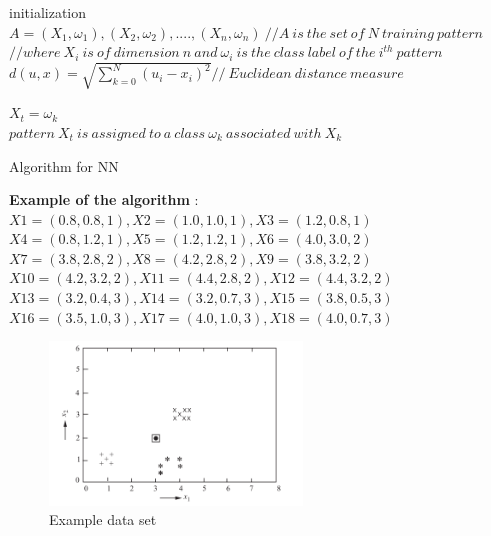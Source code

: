 \begin{algorithm}[H]
\SetAlgoLined

 initialization\;
 $ A=(X_{1},\omega_{1}),(X_{2},\omega_{2}),....,(X_{n},\omega_{n}) \ // A\ is\ the\ set\ of\ N\ training\ pattern $\\
 
 
$ //where\  X_{i}\ is\ of\ dimension\ n\ and\  \omega_{i}\ is\ the\ class\ label\ of\ the\ i^{th}\ pattern $\\
 
 
 $d(u,x) = \sqrt{\sum_{k=0}^{N} (u_{i}-x_{i})^{2}}  // \ Euclidean\ distance\ measure $\\ 

 
 $ X_{t} = \omega_{k} $ \\
 
 $ pattern\ X_{t}\ is\ assigned\ to\ a\ class\ \omega_{k}\ associated\ with\  X_{k} $
 
 \caption{Algorithm for NN}
\end{algorithm}

\vspace{5mm}
\textbf{Example of the algorithm} :\newline 
$ X1 = (0.8, 0.8, 1), X2 = (1.0, 1.0, 1), X3 = (1.2, 0.8, 1)$\\
$X4 = (0.8, 1.2, 1), X5 = (1.2, 1.2, 1), X6 = (4.0, 3.0, 2)$\\
$X7 = (3.8, 2.8, 2), X8 = (4.2, 2.8, 2), X9 = (3.8, 3.2, 2)$\\
$X10 = (4.2, 3.2, 2), X11 = (4.4, 2.8, 2), X12 = (4.4, 3.2, 2)$\\
$X13 = (3.2, 0.4, 3), X14 = (3.2, 0.7, 3), X15 = (3.8, 0.5, 3)$\\
$X16 = (3.5, 1.0, 3), X17 = (4.0, 1.0, 3), X18 = (4.0, 0.7, 3)$

\begin{figure}[H]
\centering
\includegraphics[width=0.6\textwidth]{img/nn-example.PNG}
\caption{ Example data set }
\label{fig:NN}
\end{figure}

